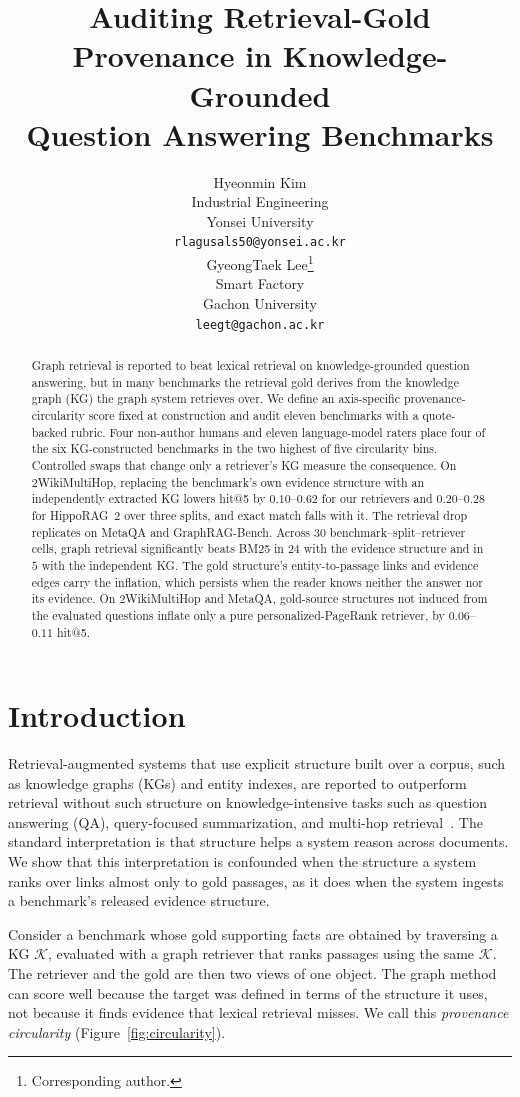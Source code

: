 \documentclass[11pt]{article}
\title{Auditing Retrieval-Gold Provenance in Knowledge-Grounded\\ Question Answering Benchmarks}
\author{Hyeonmin Kim \\
  Industrial Engineering \\
  Yonsei University \\
  \texttt{rlagusals50@yonsei.ac.kr} \\\And
  GyeongTaek Lee\thanks{Corresponding author.} \\
  Smart Factory \\
  Gachon University \\
  \texttt{leegt@gachon.ac.kr} \\}
\newcommand{\kg}{\mathcal{K}}
\begin{document}
\maketitle


\begin{abstract}
Graph retrieval is reported to beat lexical retrieval on knowledge-grounded question answering, but in many benchmarks the retrieval gold derives from the knowledge graph (KG) the graph system retrieves over. We define an axis-specific provenance-circularity score fixed at construction and audit eleven benchmarks with a quote-backed rubric. Four non-author humans and eleven language-model raters place four of the six KG-constructed benchmarks in the two highest of five circularity bins. Controlled swaps that change only a retriever's KG measure the consequence. On 2WikiMultiHop, replacing the benchmark's own evidence structure with an independently extracted KG lowers hit@5 by $0.10$--$0.62$ for our retrievers and $0.20$--$0.28$ for HippoRAG~2 over three splits, and exact match falls with it. The retrieval drop replicates on MetaQA and GraphRAG-Bench. Across $30$ benchmark--split--retriever cells, graph retrieval significantly beats BM25 in $24$ with the evidence structure and in $5$ with the independent KG. The gold structure's entity-to-passage links and evidence edges carry the inflation, which persists when the reader knows neither the answer nor its evidence. On 2WikiMultiHop and MetaQA, gold-source structures not induced from the evaluated questions inflate only a pure personalized-PageRank retriever, by $0.06$--$0.11$ hit@5.
\end{abstract}

\section{Introduction}
\label{sec:intro}
Retrieval-augmented systems that use explicit structure built over a corpus, such as knowledge graphs (KGs) and entity indexes, are reported to outperform retrieval without such structure on knowledge-intensive tasks such as question answering (QA), query-focused summarization, and multi-hop retrieval~\citep{edge2024graphrag,gutierrez2024hipporag}. The standard interpretation is that structure helps a system reason across documents. We show that this interpretation is confounded when the structure a system ranks over links almost only to gold passages, as it does when the system ingests a benchmark's released evidence structure.

Consider a benchmark whose gold supporting facts are obtained by traversing a KG $\kg$, evaluated with a graph retriever that ranks passages using the same $\kg$. The retriever and the gold are then two views of one object. The graph method can score well because the target was defined in terms of the structure it uses, not because it finds evidence that lexical retrieval misses. We call this \emph{provenance circularity} (Figure~\ref{fig:circularity}).
\end{document}

